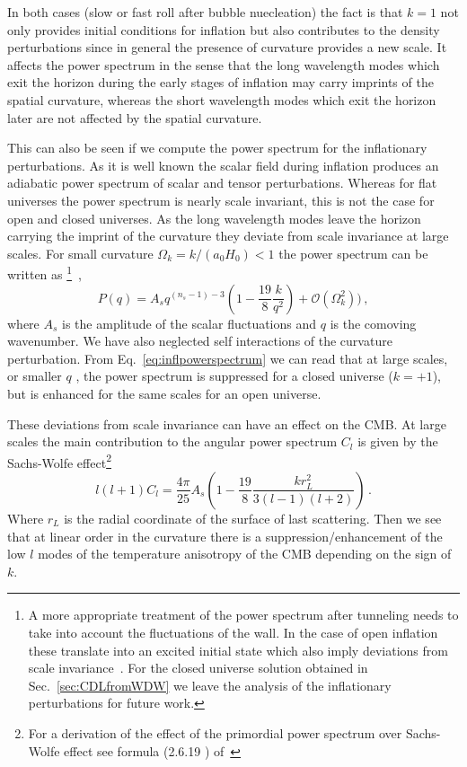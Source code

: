 \documentclass[a4paper,11pt]{article}
\numberwithin{equation}{section}
\begin{document}
\begin{itemize}
In both cases (slow or fast roll after bubble nuecleation) the fact is that $k=1$ not only provides initial conditions for inflation but also contributes to the density perturbations since in general the presence of curvature provides  a new scale. It affects the power spectrum in the sense that  the long wavelength modes which exit the horizon during the early stages of inflation may carry imprints of the spatial curvature, whereas the short wavelength modes which exit the horizon later are not affected by the spatial curvature. 

This can also be seen if we compute the power spectrum for the inflationary perturbations. As it is well known the scalar field during inflation produces an adiabatic power spectrum of scalar and tensor perturbations. Whereas for flat universes the power spectrum is nearly scale invariant, this is not the case for  open and closed universes. As the long wavelength modes leave the horizon carrying the imprint of the curvature they deviate from scale invariance at  large scales. For small curvature $\Omega_k=k/(a_0H_0) <1$ the power spectrum can be written as \footnote{A more appropriate treatment of the power spectrum after tunneling needs to take into account the fluctuations of the wall. In the case of open inflation these translate into an excited initial state which also imply deviations from scale invariance~\cite{Bucher:1994gb}. For the  closed universe solution obtained in Sec.~\ref{sec:CDLfromWDW} we leave the analysis of the inflationary  perturbations for future work.}~\cite{Cheung:2007st,Creminelli:2013cga},
\begin{equation}
P(q)=A_s q^{(n_s-1)-3}\left(1-\frac{19}{8}\frac{k}{q^2}\right)+\mathcal{O}(\Omega_k^2)) \,,
\label{eq:inflpowerspectrum}
\end{equation}
where $A_s$ is the amplitude of the scalar fluctuations   and $q$ is the comoving wavenumber. We have also neglected self interactions of the curvature perturbation. From Eq.~\eqref{eq:inflpowerspectrum} we can read that at large scales, or smaller $q$ , the power spectrum is suppressed for a closed universe ($k=+1$), but is enhanced for the same scales for an open universe.  


 These deviations from scale invariance can have an effect on the CMB. At large scales the main contribution to the angular power spectrum $C_l$ is given by the Sachs-Wolfe effect\footnote{ For a derivation of the effect of the primordial power spectrum over Sachs-Wolfe effect see formula (2.6.19 ) of~\cite{Weinberg:2008zzc}}
\begin{equation}
l(l+1)C_l=\frac{4\pi}{25}A_s\left(1-\frac{19}{8}\frac{kr_L^2}{3(l-1)(l+2)}\right) \,.\label{eq:Cls}
\end{equation}
Where $r_L$ is the radial coordinate of the surface of last scattering. Then we see that at linear order in the curvature there is a suppression/enhancement of the low $l$ modes of the temperature anisotropy of the CMB depending on the sign of $k$.


\end{itemize}
\end{document}
